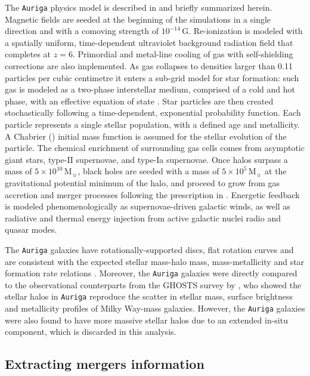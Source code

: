 The \texttt{Auriga} physics model is described in \cite{Grand2017} and briefly summarized herein. Magnetic fields are seeded at the beginning of the simulations in a single direction and with a comoving strength of $10^{-14} \, \mathrm{G}$. Re-ionization is modeled with a spatially uniform, time-dependent ultraviolet background radiation field \citep{FaucherGiguere2009} that completes at $z=6$. Primordial and metal-line cooling of gas with self-shielding corrections are also implemented. As gas collapses to densities larger than 0.11 particles per cubic centimetre it enters a sub-grid model for star formation: such gas is modeled as a two-phase interstellar medium, comprised of a cold and hot phase, with an effective equation of state \citep[see][for a detailed description]{Springel2003}. Star particles are then created stochastically following a time-dependent, exponential probability function. Each particle represents a single stellar population, with a defined age and metallicity. A Chabrier (\citeyear{Chabrier2003}) initial mass function is assumed for the stellar evolution of the particle. The chemical enrichment of surrounding gas cells comes from asymptotic giant stars, type-II supernovae,  and type-Ia supernovae. Once halos surpass a mass of $5\times 10^{10} \, \mathrm{M}_{\sun}$, black holes are seeded with a mass of $5\times 10^{5} \, \mathrm{M}_{\sun}$ at the gravitational potential minimum of the halo, and proceed to grow from gas accretion and merger processes following the prescription in \cite{Springel2005a}. Energetic feedback is modeled phenomenologically as supernovae-driven galactic winds, as well as radiative and thermal energy injection from active galactic nuclei radio and quasar modes. 

The \texttt{Auriga} galaxies have rotationally-supported discs, flat rotation curves and are consistent with the expected stellar mass-halo mass, mass-metallicity and star formation rate relations \citep{Grand2017}. Moreover, the \texttt{Auriga} galaxies were directly compared to the observational counterparts from the GHOSTS survey \citep{RadburnSmith2011,Monachesi2016b} by \cite{Monachesi2019}, who showed the stellar halos in \texttt{Auriga} reproduce the scatter in stellar mass, surface brightness and metallicity profiles of Milky Way-mass galaxies. However, the \texttt{Auriga} galaxies were also found to have more massive stellar halos due to an extended in-situ component, which is discarded in this analysis. 




\subsection{Extracting mergers information}
\label{sec:merger_info}

